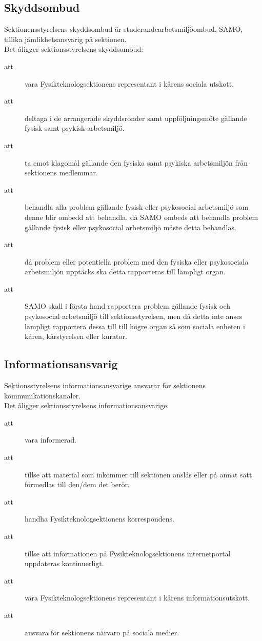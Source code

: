 \documentclass[a4paper]{article}
\begin{document}
\begin{foreningenv}{\forening{}}
    \subsection{Skyddsombud}
    Sektionensstyrelsens skyddsombud är studerandearbetsmiljöombud, SAMO, tillika jämlikhetsansvarig på sektionen.\\
    
    Det åligger sektionsstyrelsens skyddsombud:
    \begin{description}
        \item[att] vara Fysikteknologsektionens representant i kårens sociala utskott. 
        \item[att] deltaga i de arrangerade skyddsronder samt uppföljningsmöte gällande fysisk samt psykisk arbetsmiljö.
        \item[att] ta emot klagomål gällande den fysiska samt psykiska arbetsmiljön från sektionens medlemmar.
        \item[att] behandla alla problem gällande fysisk eller psykosocial arbetsmiljö som denne blir ombedd att behandla.
        då SAMO ombeds att behandla problem gällande fysisk eller psykosocial arbetsmiljö måste detta behandlas.
        \item[att] då problem eller potentiella problem med den fysiska eller psykosociala arbetsmiljön upptäcks ska detta rapporteras till lämpligt organ.
        \item[att] SAMO skall i första hand rapportera problem gällande fysisk och psykosocial arbetsmiljö till sektionsstyrelsen, men då detta inte anses lämpligt rapportera dessa till till högre organ så som sociala enheten i kåren, kårstyrelsen eller kurator.
    \end{description}
    
    \subsection{Informationsansvarig}
    Sektionsstyrelsens informationsansvarige ansvarar för sektionens kommunikationskanaler.\\
    
    Det åligger sektionsstyrelsens informationsansvarige:
    \begin{description}
        \item[att] vara informerad.
        \item[att] tillse att material som inkommer till sektionen anslås eller på annat sätt förmedlas till den/dem det berör.
        \item[att] handha Fysikteknologsektionens korrespondens.
        \item[att] tillse att informationen på Fysikteknologsektionens internetportal uppdateras kontinuerligt.
        \item[att] vara Fysikteknologsektionens representant i kårens informationsutskott.
        \item[att] ansvara för sektionens närvaro på sociala medier.
    \end{description}
\end{foreningenv}
\end{document}
